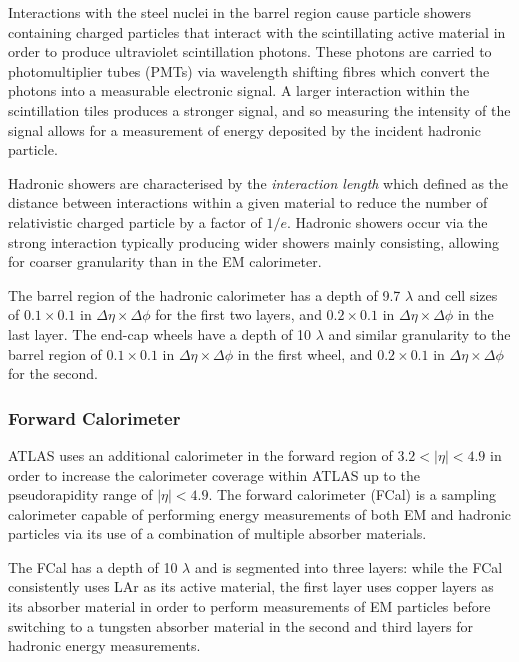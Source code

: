 \documentclass[12pt,a4paper,epsf,portrait,times,epsfig]{report}
\begin{document}
		Interactions with the steel nuclei in the barrel region cause particle showers containing charged particles that interact with the scintillating active material in order to produce ultraviolet scintillation photons. These photons are carried to photomultiplier tubes (PMTs) via wavelength shifting fibres which convert the photons into a measurable electronic signal. A larger interaction within the scintillation tiles produces a stronger signal, and so measuring the intensity of the signal allows for a measurement of energy deposited by the incident hadronic particle. \par

		Hadronic showers are characterised by the \textit{interaction length} which defined as the distance between interactions within a given material to reduce the number of relativistic charged particle by a factor of $1/e$. Hadronic showers occur via the strong interaction typically producing wider showers mainly consisting, allowing for coarser granularity than in the EM calorimeter. \par

		The barrel region of the hadronic calorimeter has a depth of 9.7 $\lambda$ and cell sizes of $0.1 \times 0.1$ in $\Delta\eta \times \Delta\phi$ for the first two layers, and $0.2 \times 0.1$ in $\Delta\eta \times \Delta\phi$ in the last layer. The end-cap wheels have a depth of 10 $\lambda$ and similar granularity to the barrel region of  $0.1 \times 0.1$ in $\Delta\eta \times \Delta\phi$ in the first wheel, and $0.2 \times 0.1$ in $\Delta\eta \times \Delta\phi$ for the second. 

		\subsubsection{Forward Calorimeter}\label{Section:FCal}

		ATLAS uses an additional calorimeter in the forward region of $3.2 < |\eta| < 4.9$ in order to increase the calorimeter coverage within ATLAS up to the pseudorapidity range of $|\eta| < 4.9$. The forward calorimeter (FCal) is a sampling calorimeter capable of performing energy measurements of both EM and hadronic particles via its use of a combination of multiple absorber materials. \par
		
		The FCal has a depth of 10 $\lambda$ and is segmented into three layers: while the FCal consistently uses LAr as its active material, the first layer uses copper layers as its absorber material in order to perform measurements of EM particles before switching to a tungsten absorber material in the second and third layers for hadronic energy measurements.  
\end{document}
